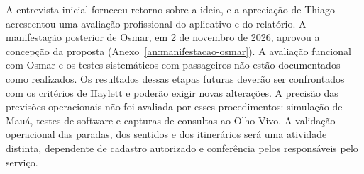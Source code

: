 A entrevista inicial forneceu retorno sobre a ideia, e a apreciação de Thiago acrescentou uma avaliação profissional do aplicativo e do relatório. A manifestação posterior de Osmar, em 2 de novembro de 2026, aprovou a concepção da proposta (Anexo~\ref{an:manifestacao-osmar}). A avaliação funcional com Osmar e os testes sistemáticos com passageiros não estão documentados como realizados. Os resultados dessas etapas futuras deverão ser confrontados com os critérios de Haylett e poderão exigir novas alterações. A precisão das previsões operacionais não foi avaliada por esses procedimentos: simulação de Mauá, testes de software e capturas de consultas ao Olho Vivo. A validação operacional das paradas, dos sentidos e dos itinerários será uma atividade distinta, dependente de cadastro autorizado e conferência pelos responsáveis pelo serviço.
